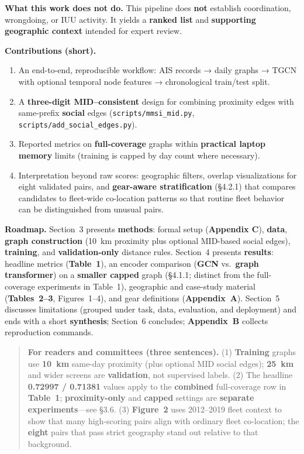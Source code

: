 \documentclass[
]{article}
\providecommand{\tightlist}{%
  \setlength{\itemsep}{0pt}\setlength{\parskip}{0pt}}
\begin{document}
\textbf{What this work does not do.} This pipeline does \textbf{not}
establish coordination, wrongdoing, or IUU activity. It yields a
\textbf{ranked list} and \textbf{supporting geographic context} intended
for expert review.

\textbf{Contributions (short).}

\begin{enumerate}
\def\labelenumi{\arabic{enumi}.}
\tightlist
\item
  An end-to-end, reproducible workflow: AIS records → daily graphs →
  TGCN with optional temporal node features → chronological train/test
  split.\\
\item
  A \textbf{three-digit MID--consistent} design for combining proximity
  edges with same-prefix \textbf{social} edges
  (\texttt{scripts/mmsi\_mid.py},
  \texttt{scripts/add\_social\_edges.py}).\\
\item
  Reported metrics on \textbf{full-coverage} graphs within
  \textbf{practical laptop memory} limits (training is capped by day
  count where necessary).\\
\item
  Interpretation beyond raw scores: geographic filters, overlap
  visualizations for eight validated pairs, and \textbf{gear-aware
  stratification} (§4.2.1) that compares candidates to fleet-wide
  co-location patterns so that routine fleet behavior can be
  distinguished from unusual pairs.
\end{enumerate}

\textbf{Roadmap.} Section~3 presents \textbf{methods}: formal setup
(\textbf{Appendix C}), \textbf{data}, \textbf{graph construction} (10~km
proximity plus optional MID-based social edges), \textbf{training}, and
\textbf{validation-only} distance rules. Section~4 presents
\textbf{results}: headline metrics (\textbf{Table~1}), an encoder
comparison (\textbf{GCN} vs.~\textbf{graph transformer}) on a
\textbf{smaller capped} graph (§4.1.1; distinct from the full-coverage
experiments in Table~1), geographic and case-study material
(\textbf{Tables~2--3}, Figures~1--4), and gear definitions
(\textbf{Appendix~A}). Section~5 discusses limitations (grouped under
task, data, evaluation, and deployment) and ends with a short
\textbf{synthesis}; Section~6 concludes; \textbf{Appendix~B} collects
reproduction commands.

\begin{quote}
\textbf{For readers and committees (three sentences).} (1)
\textbf{Training} graphs use \textbf{10~km} same-day proximity (plus
optional MID social edges); \textbf{25~km} and wider screens are
\textbf{validation}, not supervised labels. (2) The headline
\textbf{0.72997 / 0.71381} values apply to the \textbf{combined}
full-coverage row in \textbf{Table~1}; \textbf{proximity-only} and
\textbf{capped} settings are \textbf{separate experiments}---see §3.6.
(3) \textbf{Figure~2} uses 2012--2019 fleet context to show that many
high-scoring pairs align with ordinary fleet co-location; the
\textbf{eight} pairs that pass strict geography stand out relative to
that background.
\end{quote}
\end{document}
